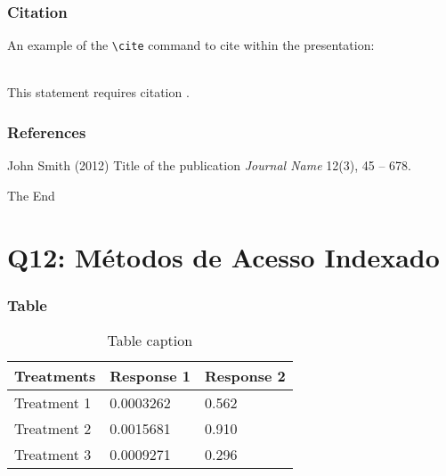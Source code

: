 \documentclass{beamer}
\begin{document}
\begin{frame}[fragile] %
\frametitle{Citation}
An example of the \verb|\cite| command to cite within the presentation:\\~

This statement requires citation \cite{p1}.
\end{frame}


\begin{frame}
\frametitle{References}
\footnotesize{
\begin{thebibliography}{99} %
 John Smith (2012)
\newblock Title of the publication
\newblock \emph{Journal Name} 12(3), 45 -- 678.
\end{thebibliography}
}
\end{frame}


\begin{frame}
\Huge{\centerline{The End}}
\end{frame}


\section{Q12: Métodos de Acesso Indexado}

\begin{frame}
\frametitle{Table}
\begin{table}
\begin{tabular}{l l l}
\toprule
\textbf{Treatments} & \textbf{Response 1} & \textbf{Response 2}\\
\midrule
Treatment 1 & 0.0003262 & 0.562 \\
Treatment 2 & 0.0015681 & 0.910 \\
Treatment 3 & 0.0009271 & 0.296 \\
\bottomrule
\end{tabular}
\caption{Table caption}
\end{table}
\end{frame}
\end{document}
